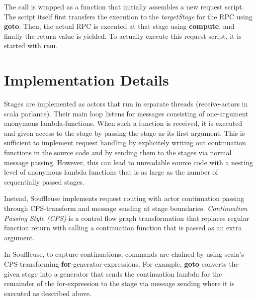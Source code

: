 \documentclass{sig-alternate}
\begin{document}
The call is wrapped as a function that initially assembles a new request script. The script itself first
transfers the execution to the \emph{targetStage} for the RPC using \textbf{goto}. Then, the actual
RPC is executed at that stage using \textbf{compute}, and finally the return value is yielded. To
actually execute this request script, it is started with \textbf{run}.




	

\section{Implementation Details}

Stages are implemented as actors that run in separate threads (receive-actors in scala parlance).
Their main loop listens for messages consisting of one-argument anonymous lambda-functions. When
such a function is received, it is executed and given access to the stage by passing the stage as
its first argument. This is sufficient to implement request handling by explicitely writing out
continuation functions in the source code and by sending them to the stages via normal message
passing. However, this can lead to unreadable source code with a nesting level of anonymous lambda
functions that is as large as the number of sequentially passed stages.

Instead, Souffleuse implements request routing with actor continuation passing through CPS-transform
and message sending at stage boundaries. \emph{Continuation Passing Style (CPS)} is a control flow
graph transformation that replaces regular function return with calling a continuation function that
is passed as an extra argument.

In Souffleuse, to capture continuations, commands are chained by using scala's
CPS-transforming-\textbf{for}-generator-expressions. For example, \textbf{goto} converts the given
stage into a generator that sends the continuation lambda for the remainder of the for-expression to
the stage via message sending where it is executed as described above.
\end{document}
